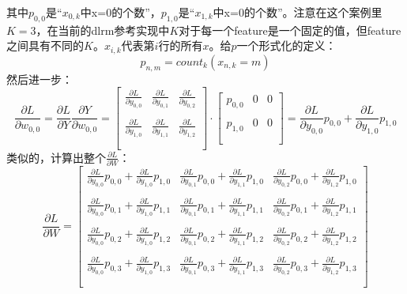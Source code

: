 \documentclass{article}
\begin{document}
其中$p_{0,0}$是“$x_{0,k}$中x=0的个数”，$p_{1,0}$是“$x_{1,k}$中x=0的个数”。注意在这个案例里$K=3$，在当前的dlrm参考实现中$K$对于每一个feature是一个固定的值，但feature之间具有不同的$K$。$x_{i,k}$代表第$i$行的所有$x$。给$p$一个形式化的定义：
$$p_{n, m}=count_{k}(x_{n,k}=m)$$
然后进一步：
$$
\frac{\partial L}{\partial w_{0,0}}=\frac{\partial L}{\partial Y} \frac{\partial Y}{\partial w_{0,0}}
=
\left[
    \begin{array}{ccc}
        \frac{\partial L}{\partial y_{0,0}} & \frac{\partial L}{\partial y_{0,1}} & \frac{\partial L}{\partial y_{0,2}}\\\\
        \frac{\partial L}{\partial y_{1,0}} & \frac{\partial L}{\partial y_{1,1}} & \frac{\partial L}{\partial y_{1,2}}\\\\
    \end{array}
\right]
\cdot
\left[
    \begin{array}{ccc}
        p_{0,0} & 0 & 0\\\\
        p_{1,0} & 0 & 0\\\\
    \end{array}
\right]
=
\frac{\partial L}{\partial y_{0,0}}p_{0,0} + \frac{\partial L}{\partial y_{1,0}}p_{1,0}
$$
类似的，计算出整个$\frac{\partial L}{\partial W}$：
$$
\frac{\partial L}{\partial W} = 
\left[
    \begin{array}{ccc}
        \frac{\partial L}{\partial y_{0,0}}p_{0,0} + \frac{\partial L}{\partial y_{1,0}}p_{1,0} & \frac{\partial L}{\partial y_{0,1}}p_{0,0} + \frac{\partial L}{\partial y_{1,1}}p_{1,0} & \frac{\partial L}{\partial y_{0,2}}p_{0,0} + \frac{\partial L}{\partial y_{1,2}}p_{1,0}\\\\
        \frac{\partial L}{\partial y_{0,0}}p_{0,1} + \frac{\partial L}{\partial y_{1,0}}p_{1,1} & \frac{\partial L}{\partial y_{0,1}}p_{0,1} + \frac{\partial L}{\partial y_{1,1}}p_{1,1} & \frac{\partial L}{\partial y_{0,2}}p_{0,1} + \frac{\partial L}{\partial y_{1,2}}p_{1,1}\\\\
        \frac{\partial L}{\partial y_{0,0}}p_{0,2} + \frac{\partial L}{\partial y_{1,0}}p_{1,2} & \frac{\partial L}{\partial y_{0,1}}p_{0,2} + \frac{\partial L}{\partial y_{1,1}}p_{1,2} & \frac{\partial L}{\partial y_{0,2}}p_{0,2} + \frac{\partial L}{\partial y_{1,2}}p_{1,2}\\\\
        \frac{\partial L}{\partial y_{0,0}}p_{0,3} + \frac{\partial L}{\partial y_{1,0}}p_{1,3} & \frac{\partial L}{\partial y_{0,1}}p_{0,3} + \frac{\partial L}{\partial y_{1,1}}p_{1,3} & \frac{\partial L}{\partial y_{0,2}}p_{0,3} + \frac{\partial L}{\partial y_{1,2}}p_{1,3}\\\\
    \end{array}
\right]
$$
\end{document}
